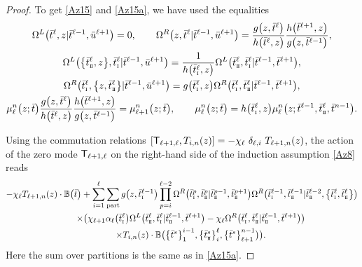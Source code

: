 \documentclass[10pt,a4paper]{amsart}
\newcommand{\so}{\scriptscriptstyle \rm I}
\newcommand{\st}{\scriptscriptstyle \rm I\hspace{-1pt}I}
\newcommand{\bu}{\bar u}
\newcommand{\bt}{{\bar t}}
\theoremstyle{definition}
\def\BB{{\mathbb{B}}}
\def\r#1{\eqref{#1}}
\def\sT{{\sf T}}
\def\vk{\chi}
\def\Oml{\Omega^L}
\def\Omr{\Omega^R}
\begin{document}
\begin{proof}
To get \r{Az15} and \r{Az15a}, we have used the equalities
\begin{gather*}
\Oml\bigl(\bt^\ell,z|\bt^{\ell-1},\bu^{\ell+1}\bigr)=0 ,\qquad
\Omr\bigl(z,\bt^\ell |\bt^{\ell-1},\bu^{\ell+1}\bigr)=\frac{g\bigl(z,\bt^\ell\bigr)}{h\bigl(\bt^\ell,z\bigr)}
\frac{h\bigl(\bt^{\ell+1},z\bigr)}{g\bigl(z,\bt^{\ell-1}\bigr)} ,\\
\Oml\bigl(\bigl\{\bt^\ell_{\st},z\bigr\},\bt^\ell_{\so}|\bt^{\ell-1},\bu^{\ell+1}\bigr)=
\frac{1}{h\bigl(\bt^\ell_{\so},z\bigr)} \Oml\bigl(\bt^\ell_{\st},\bt^\ell_{\so}|\bt^{\ell-1},\bt^{\ell+1}\bigr) ,\\
\Omr\bigl(\bt^\ell_{\so},\bigl\{z,\bt^\ell_{\st}\bigr\}|\bt^{\ell-1},\bu^{\ell+1}\bigr)
=g\bigl(\bt^\ell_{\so},z\bigr) \Omr\bigl(\bt^\ell_{\so},\bt^\ell_{\st}|\bt^{\ell-1},\bt^{\ell+1}\bigr) ,\\
\mu^n_\ell\bigl(z;\bt\bigr) \frac{g\bigl(z,\bt^\ell\bigr)}{h\bigl(\bt^\ell,z\bigr)}
\frac{h\bigl(\bt^{\ell+1},z\bigr)}{g\bigl(z,\bt^{\ell-1}\bigr)} = \mu^n_{\ell+1}\bigl(z;\bt\bigr) ,\qquad
\mu^n_\ell\bigl(z;\bt\bigr)=h\bigl(\bt^\ell_{\so},z\bigr) \mu^n_\ell\bigl(z;\bt^{\ell-1},\bt^\ell_{\st},\bt^{n-1}\bigr) .
\end{gather*}

Using the commutation relations
$
[\sT_{\ell+1,\ell},T_{i,n}(z)]=-\vk_{\ell}\ \delta_{\ell,i}\ T_{\ell+1,n}(z)
$,
the action of the zero mode $\sT_{\ell+1,\ell}$ on the right-hand side of the induction assumption \r{Az8}
reads
\begin{gather}
-\vk_{\ell} T_{\ell+1,n}(z)\cdot\BB\bigl(\bt\bigr)+
\sum_{i=1}^{\ell}\sum_{\rm part}g\bigl(z,\bt^{\ell-1}_{\so}\bigr)\prod_{p=i}^{\ell-2}
\Omr\bigl(\bt^p_{\so},\bt^p_{\st}|\bt^{p-1}_{\st},\bt^{p+1}_{\st}\bigr)
\Omr\bigl(\bt^{\ell-1}_{\so},\bt^{\ell-1}_{\st}|\bt^{\ell-2}_{\st},\bigl\{\bt^\ell_{\so},\bt^\ell_{\st}\bigr\}\bigr)\nonumber\\
\qquad\times
\bigl(\vk_{\ell+1} \alpha_{\ell}\bigl(\bt^\ell_{\so}\bigr)
\Oml\bigl(\bt^\ell_{\st},\bt^\ell_{\so}|\bt^{\ell-1}_{\st},\bt^{\ell+1}\bigr)-
\vk_\ell
\Omr\bigl(\bt^\ell_{\so},\bt^\ell_{\st}|\bt^{\ell-1}_{\st},\bt^{\ell+1}\bigr)\bigr)\nonumber\\
\qquad\times T_{i,n}(z)
\cdot \BB\bigl(\bigl\{\bt^s\bigr\}_1^{i-1},\bigl\{\bt^s_{\st}\bigr\}_i^{\ell},\bigl\{\bt^s\bigr\}_{\ell+1}^{n-1}\bigr)\bigr) .\label{Az16}
\end{gather}
Here the sum over partitions is the same as in \r{Az15a}.


\end{proof}
\end{document}
